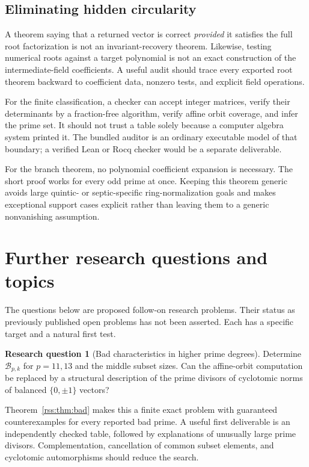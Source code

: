 \documentclass[11pt,a4paper]{article}
\theoremstyle{definition}
\newtheorem{question}[theorem]{Research question}
\theoremstyle{remark}
\begin{document}
\subsection{Eliminating hidden circularity}

A theorem saying that a returned vector is correct \emph{provided} it
satisfies the full root factorization is not an invariant-recovery theorem.
Likewise, testing numerical roots against a target polynomial is not an
exact construction of the intermediate-field coefficients. A useful audit
should trace every exported root theorem backward to coefficient data,
nonzero tests, and explicit field operations.

For the finite classification, a checker can accept integer matrices,
verify their determinants by a fraction-free algorithm, verify affine orbit
coverage, and infer the prime set. It should not trust a table solely
because a computer algebra system printed it. The bundled auditor is an
ordinary executable model of that boundary; a verified Lean or Rocq checker
would be a separate deliverable.

For the branch theorem, no polynomial coefficient expansion is necessary.
The short proof works for every odd prime at once. Keeping this theorem
generic avoids large quintic- or septic-specific ring-normalization goals
and makes exceptional support cases explicit rather than leaving them to a
generic nonvanishing assumption.

\section{Further research questions and topics}
\label{rss:sec:questions}

The questions below are proposed follow-on research problems. Their status
as previously published open problems has not been asserted. Each has a
specific target and a natural first test.

\begin{question}[Bad characteristics in higher prime degrees]
Determine $\mathcal B_{p,k}$ for $p=11,13$ and the middle subset sizes.
Can the affine-orbit computation be replaced by a structural description
of the prime divisors of cyclotomic norms of balanced $\{0,\pm1\}$ vectors?
\end{question}
Theorem~\ref{rss:thm:bad} makes this a finite exact problem with guaranteed
counterexamples for every reported bad prime. A useful first deliverable is
an independently checked table, followed by explanations of unusually
large prime divisors. Complementation, cancellation of common subset
elements, and cyclotomic automorphisms should reduce the search.
\end{document}
